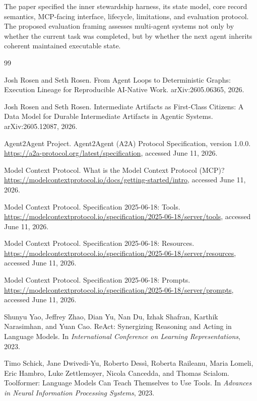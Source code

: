 \documentclass{article}
\begin{document}
The paper specified the inner stewardship harness, its state model, core record semantics, MCP-facing interface, lifecycle, limitations, and evaluation protocol. The proposed evaluation framing assesses multi-agent systems not only by whether the current task was completed, but by whether the next agent inherits coherent maintained executable state.

\begin{thebibliography}{99}

Josh Rosen and Seth Rosen.
\newblock From Agent Loops to Deterministic Graphs: Execution Lineage for Reproducible AI-Native Work.
\newblock arXiv:2605.06365, 2026.

Josh Rosen and Seth Rosen.
\newblock Intermediate Artifacts as First-Class Citizens: A Data Model for Durable Intermediate Artifacts in Agentic Systems.
\newblock arXiv:2605.12087, 2026.

Agent2Agent Project.
\newblock Agent2Agent (A2A) Protocol Specification, version 1.0.0.
\newblock \url{https://a2a-protocol.org/latest/specification}, accessed June 11, 2026.

Model Context Protocol.
\newblock What is the Model Context Protocol (MCP)?
\newblock \url{https://modelcontextprotocol.io/docs/getting-started/intro}, accessed June 11, 2026.

Model Context Protocol.
\newblock Specification 2025-06-18: Tools.
\newblock \url{https://modelcontextprotocol.io/specification/2025-06-18/server/tools}, accessed June 11, 2026.

Model Context Protocol.
\newblock Specification 2025-06-18: Resources.
\newblock \url{https://modelcontextprotocol.io/specification/2025-06-18/server/resources}, accessed June 11, 2026.

Model Context Protocol.
\newblock Specification 2025-06-18: Prompts.
\newblock \url{https://modelcontextprotocol.io/specification/2025-06-18/server/prompts}, accessed June 11, 2026.

Shunyu Yao, Jeffrey Zhao, Dian Yu, Nan Du, Izhak Shafran, Karthik Narasimhan, and Yuan Cao.
\newblock ReAct: Synergizing Reasoning and Acting in Language Models.
\newblock In \emph{International Conference on Learning Representations}, 2023.

Timo Schick, Jane Dwivedi-Yu, Roberto Dess\`i, Roberta Raileanu, Maria Lomeli, Eric Hambro, Luke Zettlemoyer, Nicola Cancedda, and Thomas Scialom.
\newblock Toolformer: Language Models Can Teach Themselves to Use Tools.
\newblock In \emph{Advances in Neural Information Processing Systems}, 2023.


\end{thebibliography}
\end{document}
